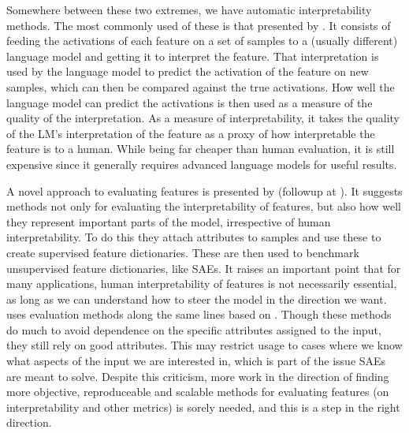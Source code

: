 Somewhere between these two extremes, we have automatic interpretability methods.
The most commonly used of these is that presented by \textcite{bills_language_2023}.
It consists of feeding the activations of each feature on a set of samples to a (usually different) language model and getting it to interpret the feature.
That interpretation is used by the language model to predict the activation of the feature on new samples, which can then be compared against the true activations.
How well the language model can predict the activations is then used as a measure of the quality of the interpretation.
As a measure of interpretability, it takes the quality of the LM's interpretation of the feature as a proxy of how interpretable the feature is to a human.
While being far cheaper than human evaluation, it is still expensive since it generally requires advanced language models for useful results.

A novel approach to evaluating features is presented by \textcite{makelov_towards_2024} (followup at \textcite{makelov_saes_2023}).
It suggests methods not only for evaluating the interpretability of features, but also how well they represent important parts of the model, irrespective of human interpretability.
To do this they attach attributes to samples and use these to create supervised feature dictionaries.
These are then used to benchmark unsupervised feature dictionaries, like SAEs.
It raises an important point that for many applications, human interpretability of features is not necessarily essential, as long as we can understand how to steer the model in the direction we want.
\textcite{huben_research_2024} uses evaluation methods along the same lines based on \textcite{li_emergent_2023}.
Though these methods do much to avoid dependence on the specific attributes assigned to the input, they still rely on good attributes.
This may restrict usage to cases where we know what aspects of the input we are interested in, which is part of the issue SAEs are meant to solve.
Despite this criticism, more work in the direction of finding more objective, reproduceable and scalable methods for evaluating features (on interpretability and other metrics) is sorely needed, and this is a step in the right direction.




